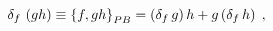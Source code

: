 \begin{equation}
\delta_{f}\,\left(  gh\right)  \equiv\left\{  f,gh\right\}
_{{\footnotesize PB}}=\left(  \delta_{f}\,g\right)  h+g\left(  \delta
_{f}\,h\right)  \;,
\end{equation}

